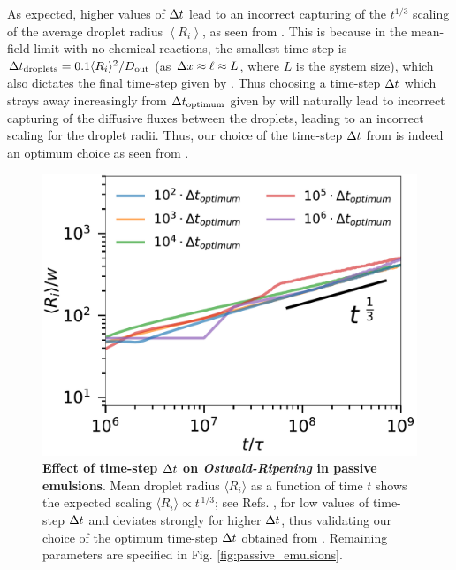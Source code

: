 As expected, higher values of $\Delta t$ lead to an incorrect capturing of the $t^{1/3}$ scaling of the average droplet radius $\left \langle R_i \right \rangle$, as seen from .
This is because in the mean-field limit with no chemical reactions, the smallest time-step is $\Delta t_\mathrm{droplets} = 0.1 \langle R_i\rangle^2/D_\mathrm{out}$ (as $\Delta x \approx \ell \approx L$, where $L$ is the system size), which also dictates the final time-step given by .
Thus choosing a time-step $\Delta t$ which strays away increasingly from $\Delta t_\mathrm{optimum}$ given by  will naturally lead to incorrect capturing of the diffusive fluxes between the droplets, leading to an incorrect scaling for the droplet radii. 
Thus, our choice of the time-step $\Delta t$ from  is indeed an optimum choice as seen from .

\begin{figure}[tb]
\centering
\includegraphics[scale=0.5]{MainContent/Figures/LSW_all.pdf}
\caption{\textbf{Effect of time-step $\Delta t$ on \textit{Ostwald-Ripening} in passive emulsions}.
Mean droplet radius $\langle R_i \rangle$ as a function of time $t$ shows the expected scaling $\langle R_i \rangle \propto t^{\,1/3}$; see Refs. \cite{Lifshitz,Wagner,LSWanalytics}, for low values of time-step $\Delta t$ and deviates strongly for higher $\Delta t$, thus validating our choice of the optimum time-step $\Delta t$ obtained from .
Remaining parameters are specified in Fig. \ref{fig:passive_emulsions}.
}
\label{fig:passive_emulsions_all}
\end{figure}

